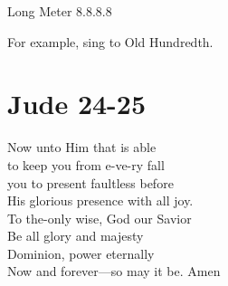 \documentclass{article}
\begin{document}
\noindent Long Meter 8.8.8.8

\noindent For example, sing to Old Hundredth.

\section*{Jude 24-25}

 Now unto Him that is able\\
to keep you from e-ve-ry fall\\
you to present faultless before\\
His glorious presence with all joy.\\

 To the-only wise, God our Savior\\
Be all glory and majesty\\
Dominion, power eternally\\
Now and forever---so may it be. Amen\\
\end{document}
